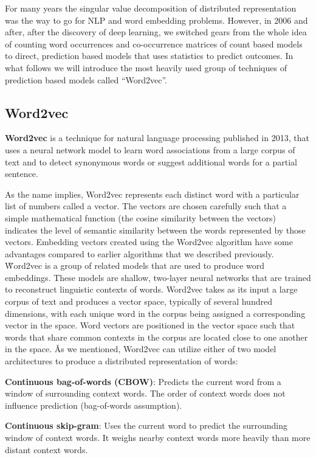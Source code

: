 For many years the singular value decomposition of distributed representation was the way to go for NLP and word
embedding problems. However, in 2006 and after, after the discovery of deep learning, we switched gears from the
whole idea of counting word occurrences and co-occurrence matrices of count based models to direct, prediction based
models that uses statistics to predict outcomes. In what follows we will introduce the most heavily used group of
techniques of prediction based models called ``Word2vec''.

\subsection{Word2vec}

\textbf{Word2vec} is a technique for natural language processing published in 2013, that uses a neural network model to
learn word associations from a large corpus of text and to detect synonymous words or suggest additional words for a
partial sentence.
\ed

As the name implies, Word2vec represents each distinct word with a particular list of numbers called a vector. The
vectors are chosen carefully such that a simple mathematical function (the cosine similarity between the vectors)
indicates the level of semantic similarity between the words represented by those vectors. Embedding vectors created
using the Word2vec algorithm have some advantages compared to earlier algorithms that we described previously. \v

Word2vec is a group of related models that are used to produce word embeddings. These models are shallow, two-layer
neural networks that are trained to reconstruct linguistic contexts of words. Word2vec takes as its input a large
corpus of text and produces a vector space, typically of several hundred dimensions, with each unique word in the
corpus being assigned a corresponding vector in the space. Word vectors are positioned in the vector space such that
words that share common contexts in the corpus are located close to one another in the space. \v

As we mentioned, Word2vec can utilize either of two model architectures to produce a distributed representation of
words:
\bit
\item \textbf{Continuous bag-of-words (CBOW)}: Predicts the current word from a window of surrounding context words.
The order of context words does not influence prediction (bag-of-words assumption).
\item \textbf{Continuous skip-gram}: Uses the current word to predict the surrounding window of context words. It
weighs nearby context words more heavily than more distant context words.
\eit

